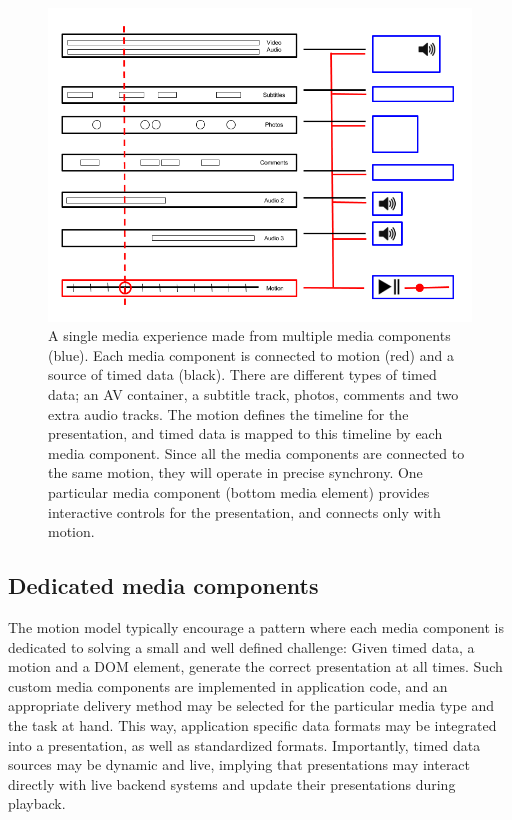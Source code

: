 \begin{figure}[h]
\centering
\includegraphics[scale=.4]{fig/motion-media.png}
\caption{A single media experience made from multiple media components (blue). Each media component is connected to motion (red) and a source of timed data (black). There are different types of timed data; an AV container, a subtitle track, photos, comments and two extra audio tracks. The motion defines the timeline for the presentation, and timed data is mapped to this timeline by each media component. Since all the media components are connected to the same motion, they will operate in precise synchrony. One particular media component (bottom media element) provides interactive controls for the presentation, and connects only with motion.}
\label{fig:motion-media}
\end{figure}


\subsection{Dedicated media components}

The motion model typically encourage a pattern where each media
component is dedicated to solving a small and well defined challenge: Given
timed data, a motion and a DOM element, generate the correct presentation at
all times. Such custom media components are implemented in application code,
and an appropriate delivery method may be selected for the particular media
type and the task at hand. This way, application specific data formats may be
integrated into a presentation, as well as standardized formats. Importantly,
timed data sources may be dynamic and live, implying that presentations may
interact directly with live backend systems and update their presentations
during playback.

